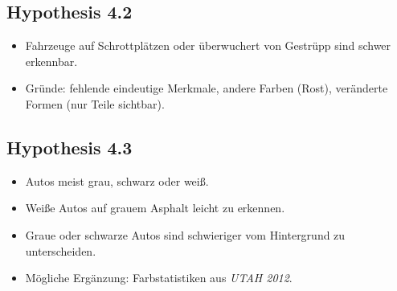 \subsection*{Hypothesis 4.2}
\begin{itemize}
  \item Fahrzeuge auf Schrottplätzen oder überwuchert von Gestrüpp sind schwer erkennbar.
  \item Gründe: fehlende eindeutige Merkmale, andere Farben (Rost), veränderte Formen (nur Teile sichtbar).
\end{itemize}

\subsection*{Hypothesis 4.3}
\begin{itemize}
  \item Autos meist grau, schwarz oder weiß.
  \item Weiße Autos auf grauem Asphalt leicht zu erkennen.
  \item Graue oder schwarze Autos sind schwieriger vom Hintergrund zu unterscheiden.
  \item Mögliche Ergänzung: Farbstatistiken aus \emph{UTAH 2012}.
\end{itemize}



